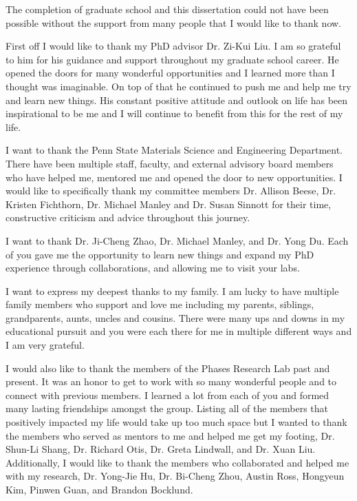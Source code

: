 The completion of graduate school and this dissertation could not have been possible without the support from many people that I would like to thank now.

First off I would like to thank my PhD advisor Dr. Zi-Kui Liu. I am so grateful to him for his guidance and support throughout my graduate school career. He opened the doors for many wonderful opportunities and I learned more than I thought was imaginable. On top of that he continued to push me and help me try and learn new things. His constant positive attitude and outlook on life has been inspirational to be me and I will continue to benefit from this for the rest of my life.

I want to thank the Penn State Materials Science and Engineering Department. There have been multiple staff, faculty, and external advisory board members who have helped me, mentored me and opened the door to new opportunities. I would like to specifically thank my committee members Dr. Allison Beese, Dr. Kristen Fichthorn, Dr. Michael Manley and Dr. Susan Sinnott for their time, constructive criticism and advice throughout this journey.

I want to thank Dr. Ji-Cheng Zhao, Dr. Michael Manley, and Dr. Yong Du. Each of you gave me the opportunity to learn new things and expand my PhD experience through collaborations, and allowing me to visit your labs. 

I want to express my deepest thanks to my family. I am lucky to have multiple family members who support and love me including my parents, siblings, grandparents, aunts, uncles and cousins. There were many ups and downs in my educational pursuit and you were each there for me in multiple different ways and I am very grateful.

I would also like to thank the members of the Phases Research Lab past and present. It was an honor to get to work with so many wonderful people and to connect with previous members. I learned a lot from each of you and formed many lasting friendships amongst the group. Listing all of the members that positively impacted my life would take up too much space but I wanted to thank the members who served as mentors to me and helped me get my footing, Dr. Shun-Li Shang, Dr. Richard Otis, Dr. Greta Lindwall, and Dr. Xuan Liu. Additionally, I would like to thank the members who collaborated and helped me with my research, Dr. Yong-Jie Hu, Dr. Bi-Cheng Zhou, Austin Ross, Hongyeun Kim, Pinwen Guan, and Brandon Bocklund. 

